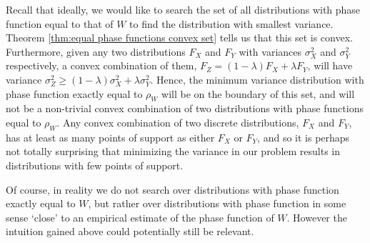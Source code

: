 Recall that ideally, we would like to search the set of all distributions with phase function equal to that of $W$ to find the distribution with smallest variance. Theorem \ref{thm:equal phase functions convex set} tells us that this set is convex. 
Furthermore, given any two distributions $F_X$ and $F_Y$ with variances $\sigma_X^2$ and $\sigma_Y^2$ respectively, a convex combination of them, $F_Z = (1 - \lambda)F_X + \lambda F_Y$, will have variance $\sigma_Z^2 \geq (1 - \lambda) \sigma_X^2 + \lambda \sigma_Y^2$. Hence, the minimum variance distribution with phase function exactly equal to $\rho_W$ will be on the boundary of this set, and will not be a non-trivial convex combination of two distributions with phase functions equal to $\rho_W$. Any convex combination of two discrete distributions, $F_X$ and $F_Y$, has at least as many points of support as either $F_X$ or $F_Y$, and so it is perhaps not totally surprising that minimizing the variance in our problem results in distributions with few points of support.

Of course, in reality we do not search over distributions with phase function exactly equal to $W$, but rather over distributions with phase function in some sense `close' to an empirical estimate of the phase function of $W$. However the intuition gained above could potentially still be relevant.






	

